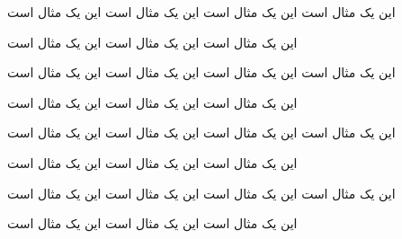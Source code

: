 \documentclass{report}
\begin{document}
این یک مثال است
این یک مثال است
این یک مثال است
این یک مثال است

این یک مثال است
این یک مثال است
این یک مثال است

این یک مثال است
این یک مثال است
این یک مثال است
این یک مثال است

این یک مثال است
این یک مثال است
این یک مثال است

این یک مثال است
این یک مثال است
این یک مثال است
این یک مثال است

این یک مثال است
این یک مثال است
این یک مثال است

این یک مثال است
این یک مثال است
این یک مثال است
این یک مثال است

این یک مثال است
این یک مثال است
این یک مثال است
\end{document}
